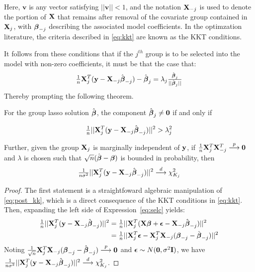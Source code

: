 Here, $\mathbf{v}$ is any vector satisfying $||\mathbf{v}|| < 1$, and the notation $\mathbf{X}_{-j}$ is used to denote the portion of $\mathbf{X}$ that remains after removal of the covariate group contained in $\mathbf{X}_j$, with $\boldsymbol{\beta}_{-j}$ describing the associated model coefficients.  In the optimzation literature, the criteria described in \ref{eq:kkt} are known as the KKT conditions.  

It follows from these conditions that if the $j^{th}$ group is to be selected into the model with non-zero coefficients, it must be that the case that:
\begin{equation}
  \label{eq:post_ktt}
\tfrac{1}{n}\mathbf{X}_j^T(\mathbf{y} - \mathbf{X}_{-j}\hat{\boldsymbol{\beta}}_{-j}) - \hat{\boldsymbol{\beta}}_j = \lambda_j\tfrac{\hat{\boldsymbol{\beta}}_j}{||\hat{\boldsymbol{\beta}}_j||}
\end{equation}
Thereby prompting the following theorem.

\begin{theorem}
\label{Thm:main}
For the group lasso solution $\hat{\boldsymbol{\beta}}$, the component $\hat{\boldsymbol{\beta}}_j \ne \mathbf{0}$ if and only if

\begin{equation}
  \label{eq:selc}
\tfrac{1}{n}||\mathbf{X}_j^T(\mathbf{y} - \mathbf{X}_{-j}\hat{\boldsymbol{\beta}}_{-j})||^2 > \lambda_j^2
\end{equation}

Further, given the group $\mathbf{X}_j$ is marginally independent of $\mathbf{y}$, if $\tfrac{1}{n}\mathbf{X}_j^T \mathbf{X}_{-j}^T \overset{p}{\longrightarrow} \mathbf{0}$ and $\lambda$ is chosen such that $\sqrt{n}(\hat{\boldsymbol{\beta}} -  \boldsymbol{\beta})$ is bounded in probability, then
\begin{equation}
  \label{eq:thm1}
  \tfrac{1}{n \sigma^2}||\mathbf{X}_j^T(\mathbf{y} - \mathbf{X}_{-j}\hat{\boldsymbol{\beta}}_{-j})||^2 \overset{d}{\longrightarrow} \chi^2_{K_j}
\end{equation}
\end{theorem}

\begin{proof}
The first statement is a straightfoward algebraic manipulation of \ref{eq:post_kk}, which is a direct consequence of the KKT conditions in \ref{eq:kkt}.  Then, expanding the left side of Expression~\ref{eq:selc} yields:
\begin{align}
\begin{alignedat}{2}
\tfrac{1}{n}||\mathbf{X}_j^T(\mathbf{y} - \mathbf{X}_{-j}\hat{\boldsymbol{\beta}}_{-j})||^2 &= \tfrac{1}{n}||\mathbf{X}_j^T(\mathbf{X}\boldsymbol{\beta} + \boldsymbol{\epsilon} - \mathbf{X}_{-j}\hat{\boldsymbol{\beta}}_{-j})||^2 \\
                                                     &= \tfrac{1}{n}||\mathbf{X}_j^T\boldsymbol{\epsilon} - \mathbf{X}_j^T\mathbf{X}_{-j}(\boldsymbol{\beta}_{-j} - \hat{\boldsymbol{\beta}}_{-j})||^2 
\end{alignedat}
\end{align}
Noting $\tfrac{1}{\sqrt{n}} \mathbf{X}_j^T\mathbf{X}_{-j}(\boldsymbol{\beta}_{-j} - \hat{\boldsymbol{\beta}}_{-j}) \overset{p}{\longrightarrow} \mathbf{0}$ and $\boldsymbol{\epsilon} \sim N(\mathbf{0},\sigma^2\mathbf{I})$, we have $\tfrac{1}{n \sigma^2}||\mathbf{X}_j^T(\mathbf{y} - \mathbf{X}_{-j}\hat{\boldsymbol{\beta}}_{-j})||^2 \overset{d}{\longrightarrow} \chi^2_{K_j}$.
\end{proof}

